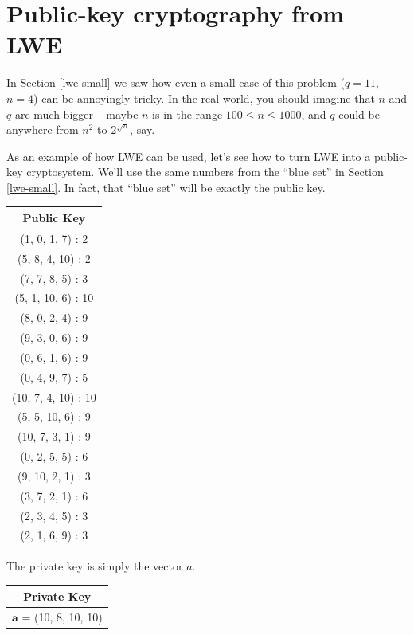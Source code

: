 \section{Public-key cryptography from LWE}\label{lwe-crypto}

In Section \ref{lwe-small} we saw how even a small case of this problem
($q = 11$, $n = 4$) can be annoyingly tricky. In the real world, you
should imagine that $n$ and $q$ are much bigger -- maybe $n$ is in
the range $100 \leq n \leq 1000$, and $q$ could be anywhere from
$n^{2}$ to $2^{\sqrt{n}}$, say.

As an example of how LWE can be used, let's see how to turn LWE into a
public-key cryptosystem. We'll use the same numbers from the ``blue
set'' in Section \ref{lwe-small}. In fact, that ``blue set'' will be exactly the
public key.

\begin{center}
\begin{tabular}{|c|}
\hline
Public Key \\
\hline
\hline
(1, 0, 1, 7) : 2 \\
\hline
(5, 8, 4, 10) : 2 \\
\hline
(7, 7, 8, 5) : 3 \\
\hline
(5, 1, 10, 6) : 10 \\
\hline
(8, 0, 2, 4) : 9 \\
\hline
(9, 3, 0, 6) : 9 \\
\hline
(0, 6, 1, 6) : 9 \\
\hline
(0, 4, 9, 7) : 5 \\
\hline
(10, 7, 4, 10) : 10 \\
\hline
(5, 5, 10, 6) : 9 \\
\hline
(10, 7, 3, 1) : 9 \\
\hline
(0, 2, 5, 5) : 6 \\
\hline
(9, 10, 2, 1) : 3 \\
\hline
(3, 7, 2, 1) : 6 \\
\hline
(2, 3, 4, 5) : 3 \\
\hline
(2, 1, 6, 9) : 3 \\
\hline
\end{tabular}
\end{center}

The private key is simply the vector $a$.

\begin{center}
\begin{tabular}{|c|}
\hline
Private Key \\
\hline
\hline
$\mathbf{a}$ = (10, 8, 10, 10) \\
\hline
\end{tabular}
\end{center}


